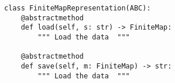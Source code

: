 \par\begin{minipage}{60ex}
\begin{verbatim}
class FiniteMapRepresentation(ABC):
    @abstractmethod
    def load(self, s: str) -> FiniteMap:
        """ Load the data  """

    @abstractmethod
    def save(self, m: FiniteMap) -> str:
        """ Load the data  """
\end{verbatim}
\end{minipage}\par